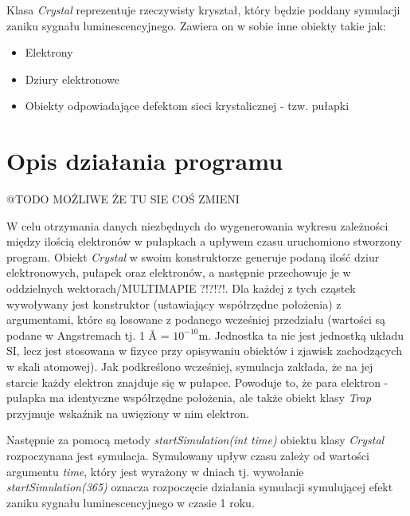 Klasa \textit{Crystal} reprezentuje rzeczywisty kryształ, który będzie poddany symulacji zaniku sygnału luminescencyjnego. Zawiera on w sobie inne obiekty takie jak:

\begin{itemize}
\item Elektrony
\item Dziury elektronowe
\item Obiekty odpowiadające defektom sieci krystalicznej - tzw. pułapki
\end{itemize}

\section{Opis działania programu}
@TODO MOŻLIWE ŻE TU SIE COŚ ZMIENI


W celu otrzymania danych niezbędnych do wygenerowania wykresu zależności między ilością elektronów w pułapkach a upływem czasu uruchomiono stworzony program. Obiekt \textit{Crystal} w swoim konstruktorze generuje podaną ilość dziur elektronowych, pułapek oraz elektronów, a następnie przechowuje je w oddzielnych wektorach/MULTIMAPIE ?!?!?!. Dla każdej z tych cząstek wywoływany jest konstruktor (ustawiający współrzędne położenia) z argumentami, które są losowane z podanego wcześniej przedziału (wartości są podane w Angstremach tj. 1 Å = $10^{-10}$m. Jednostka ta nie jest jednostką układu SI, lecz jest stosowana w fizyce przy opisywaniu obiektów i zjawisk zachodzących w skali atomowej). Jak podkreślono wcześniej, symulacja zakłada, że na jej starcie każdy elektron znajduje się w pułapce. Powoduje to, że para elektron - pułapka ma identyczne współrzędne położenia, ale także obiekt klasy \textit{Trap} przyjmuje wskaźnik na uwięziony w nim elektron.

Następnie za pomocą metody \textit{startSimulation(int time)} obiektu klasy \textit{Crystal} rozpoczynana jest symulacja. Symulowany upływ czasu  zależy od wartości argumentu \textit{time}, który jest wyrażony w dniach tj. wywołanie \emph{startSimulation(365)} oznacza rozpoczęcie działania symulacji symulującej efekt zaniku sygnału luminescencyjnego w czasie 1 roku.

